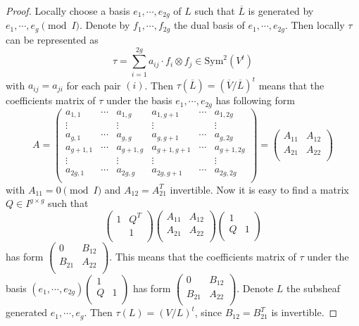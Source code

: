 \documentclass[12pt,twoside]{book}
\theoremstyle{plain}
\theoremstyle{definition}
\theoremstyle{remark}
\numberwithin{equation}{section}
\begin{document}
\begin{proof}
Locally choose a basis $e_1,\cdots,e_{2g}$ of $L$ such that $\overline{L}$ is generated by $e_1,\cdots,e_g \pmod{I}$. Denote by $f_1,\cdots,f_{2g}$ the dual basis of $e_1,\cdots,e_{2g}$. Then locally $\tau$ can be represented as
\[\tau = \sum_{i=1}^{2g} a_{ij} \cdot f_i\otimes f_j \in \mathrm{Sym}^2(V^t)\]
with $a_{ij}=a_{ji}$ for each pair $(i)$. Then $\tau(\overline{L}) = (\overline{V}/\overline{L})^t$ means that the coefficients matrix of $\tau$ under the basis $e_1,\cdots,e_{2g}$ has following form
\[A=\left(\begin{array}{cccccc}
a_{1,1} & \cdots & a_{1,g} & a_{1,g+1} & \cdots & a_{1,2g} \\
\vdots & & \vdots & \vdots & & \vdots \\
a_{g,1} & \cdots & a_{g,g} & a_{g,g+1} & \cdots & a_{g,2g} \\
a_{g+1,1} & \cdots & a_{g+1,g} & a_{g+1,g+1} & \cdots & a_{g+1,2g} \\
\vdots & & \vdots & \vdots & & \vdots \\
a_{2g,1} & \cdots & a_{2g,g} & a_{2g,g+1} & \cdots & a_{2g,2g} \\
\end{array}\right) = \left(\begin{array}{cc}
A_{11} & A_{12} \\ A_{21} & A_{22}\\
\end{array}\right)\]
with $A_{11}=0\pmod{I}$ and $A_{12}=A_{21}^T$ invertible.
Now it is easy to find a matrix $Q\in I^{g\times g}$ such that
\[\left(\begin{array}{cc}1&Q^T\\&1\\\end{array}\right) \left(\begin{array}{cc}
A_{11} & A_{12} \\ A_{21} & A_{22}\\
\end{array}\right) \left(\begin{array}{cc}1&\\Q&1\\\end{array}\right)\]
has form $\left(\begin{array}{cc} 0&B_{12}\\B_{21}&A_{22}\\ \end{array}\right)$. This means that the coefficients matrix of $\tau$ under the basis $(e_1,\cdots,e_{2g})\left(\begin{array}{cc}1&\\Q&1\\\end{array}\right)$ has form $\left(\begin{array}{cc} 0&B_{12}\\B_{21}&A_{22}\\ \end{array}\right)$. Denote $L$ the subsheaf generated $e_1,\cdots,e_g$. Then $\tau(L)=(V/L)^t$, since $B_{12}=B_{21}^T$ is invertible.
\end{proof}
\end{document}
